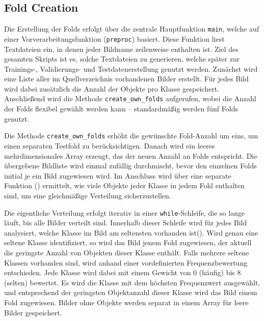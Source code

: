 \subsection{Fold Creation}
\label{subsec:Fold_creation}


Die Erstellung der Folds erfolgt über die zentrale Hauptfunktion \texttt{main}, welche auf einer Vorverarbeitungsfunktion (\texttt{preproc}) basiert. Diese Funktion liest Textdateien ein, in denen jeder Bildname zeilenweise enthalten ist. Ziel des gesamten Skripts ist es, solche Textdateien zu generieren, welche später zur Trainings-, Validierungs- und Testdatenerstellung genutzt werden. Zunächst wird eine Liste aller im Quellverzeichnis vorhandenen Bilder erstellt. Für jedes Bild wird dabei zusätzlich die Anzahl der Objekte pro Klasse gespeichert. Anschließend wird die Methode \texttt{create\_own\_folds} aufgerufen, wobei die Anzahl der Folds flexibel gewählt werden kann – standardmäßig werden fünf Folds genutzt.

Die Methode \texttt{create\_own\_folds} erhöht die gewünschte Fold-Anzahl um eins, um einen separaten Testfold zu berücksichtigen. Danach wird ein leeres mehrdimensionales Array erzeugt, das der neuen Anzahl an Folds entspricht. Die übergebene Bildliste wird einmal zufällig durchmischt, bevor den einzelnen Folds initial je ein Bild zugewiesen wird. Im Anschluss wird über eine separate Funktion () ermittelt, wie viele Objekte jeder Klasse in jedem Fold enthalten sind, um eine gleichmäßige Verteilung sicherzustellen.

Die eigentliche Verteilung erfolgt iterativ in einer \texttt{while}-Schleife, die so lange läuft, bis alle Bilder verteilt sind. Innerhalb dieser Schleife wird für jedes Bild analysiert, welche Klasse im Bild am seltensten vorhanden ist(). Wird genau eine seltene Klasse identifiziert, so wird das Bild jenem Fold zugewiesen, der aktuell die geringste Anzahl von Objekten dieser Klasse enthält. Falls mehrere seltene Klassen vorhanden sind, wird anhand einer vordefinierten Frequenzbewertung entschieden. Jede Klasse wird dabei mit einem Gewicht von 0 (häufig) bis 8 (selten) bewertet. Es wird die Klasse mit dem höchsten Frequenzwert ausgewählt, und entsprechend der geringsten Objektanzahl dieser Klasse wird das Bild einem Fold zugewiesen. Bilder ohne Objekte werden separat in einem Array für leere Bilder gespeichert.

